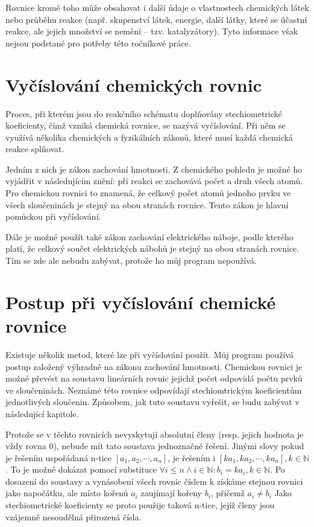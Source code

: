 \documentclass[12pt,a4paper]{report}
\begin{document}
Rovnice kromě toho může obsahovat i další údaje o vlastnostech chemických látek nebo průběhu reakce (např. skupenství látek, energie, další látky, které se účastní reakce, ale jejich množství se nemění -- tzv. katalyzátory). Tyto informace však nejsou podstané pro potřeby této ročníkové práce.

\section{Vyčíslování chemických rovnic}
Proces, při kterém jsou do reakčního schématu doplňovány stechiometrické koeficienty, čímž vzniká chemická rovnice, se nazývá vyčíslování. Při něm se využívá několika chemických a fyzikálních zákonů, které musí každá chemická reakce splňovat.

Jedním z nich je zákon zachování hmotnosti. Z chemického pohledu je možné ho vyjádřit v následujícím znění: při reakci se zachovává počet a druh všech atomů. Pro chemickou rovnici to znamená, že celkový počet atomů jednoho prvku ve všech sloučeninách je stejný na obou stranách rovnice. Tento zákon je hlavní pomůckou při vyčíslování.

Dále je možné použít také zákon zachování elektrického náboje, podle kterého platí, že celkový součet elektrických nábohů je stejný na obou stranách rovnice. Tím se zde ale nebudu zabývat, protože ho můj program nepoužívá.

\section{Postup při vyčíslování chemické rovnice}
Existuje několik metod, které lze při vyčíslování použít. Můj program používá postup založený výhradně na zákonu zachování hmotnosti. Chemickou rovnici je možné převést na soustavu lineárních rovnic jejichž počet odpovídá počtu prvků ve sloučeninách. Neznámé této rovnice odpovídají stechiomtrickým koeficientům jednotlivých sloučenin. Způsobem, jak tuto soustavu vyřešit, se budu zabývat v následující kapitole.

Protože se v těchto rovnicích nevyskytují absolutní členy (resp. jejich hodnota je vždy rovna 0), nebude mít tato soustava jednoznačné řešení. Jinými slovy pokud je řešením 
uspořádaná n-tice $ [a_1, a_2, \cdots, a_n] $, je řešením i $ [ka_1, ka_2, \cdots, ka_n], k \in \mathbb{N} $. To je možné dokázat pomocí substituce $ \forall i \leq n \wedge i \in \mathbb{N}: b_i = ka_i, k \in \mathbb{N} $. Po dosazení do soustavy a vynásobení všech rovnic číslem k získáme stejnou rovnici jako napočátku, ale místo kořenů $ a_i $ zaujímají kořeny $ b_i $, přičemž $ a_i \neq b_i $ Jako stechiometrické koeficienty se proto použije taková n-tice, jejíž členy jsou vzájemně nesoudělná přirozená čísla.
\end{document}
